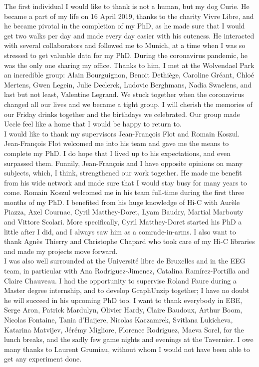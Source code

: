 
The first individual I would like to thank is not a human, but my dog Curie. He became a part of my life on 16 April 2019, thanks to the charity Vivre Libre, and he became pivotal in the completion of my PhD, as he made sure that I would get two walks per day and made every day easier with his cuteness. He interacted with several collaborators and followed me to Munich, at a time when I was so stressed to get valuable data for my PhD. During the coronavirus pandemic, he was the only one sharing my office. Thanks to him, I met at the Wolvendael Park an incredible group: Alain Bourguignon, Benoit Dethiège, Caroline Gréant, Chloé Mertens, Gwen Legein, Julie Declerck, Ludovic Berghmans, Nadia Swaelens, and last but not least, Valentine Legrand. We stuck together when the coronavirus changed all our lives and we became a tight group. I will cherish the memories of our Friday drinks together and the birthdays we celebrated. Our group made Uccle feel like a home that I would be happy to return to.\\

I would like to thank my supervisors Jean-François Flot and Romain Koszul. Jean-François Flot welcomed me into his team and gave me the means to complete my PhD. I do hope that I lived up to his expectations, and even surpassed them. Funnily, Jean-François and I have opposite opinions on many subjects, which, I think, strengthened our work together. He made me benefit from his wide network and made sure that I would stay busy for many years to come. Romain Koszul welcomed me in his team full-time during the first three months of my PhD. I benefited from his huge knowledge of Hi-C with Aurèle Piazza, Axel Cournac, Cyril Matthey-Doret, Lyam Baudry, Martial Marbouty and Vittore Scolari. More specifically, Cyril Matthey-Doret started his PhD a little after I did, and I always saw him as a comrade-in-arms. I also want to thank Agnès Thierry and Christophe Chapard who took care of my Hi-C libraries and made my projects move forward. \\

I was also well surrounded at the Université libre de Bruxelles and in the EEG team, in particular with Ana Rodriguez-Jimenez, Catalina Ramírez-Portilla and Claire Chauveau. I had the opportunity to supervise Roland Faure during a Master degree internship, and to develop GraphUnzip together; I have no doubt he will succeed in his upcoming PhD too. I want to thank everybody in EBE, Serge Aron, Patrick Mardulyn, Olivier Hardy, Claire Baudoux, Arthur Boom, Nicolas Fontaine, Tania d'Haijere, Nicolas Kaczamrek, Svitlana Lukicheva, Katarina Matvijev, Jérémy Migliore, Florence Rodriguez, Maeva Sorel, for the lunch breaks, and the sadly few game nights and evenings at the Tavernier. I owe many thanks to Laurent Grumiau, without whom I would not have been able to get any experiment done. \\

